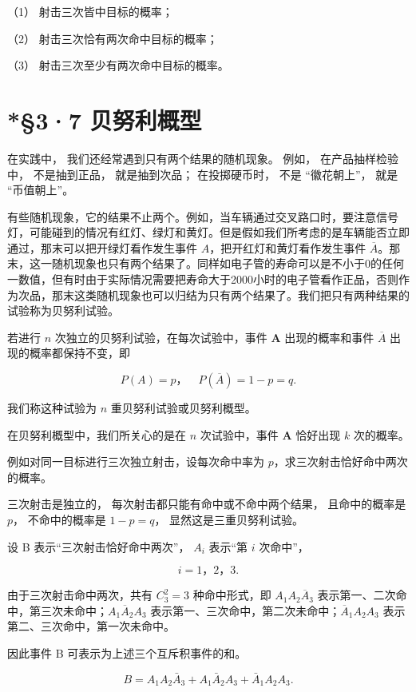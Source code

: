（1） 射击三次皆中目标的概率；

（2） 射击三次恰有两次命中目标的概率；

（3） 射击三次至少有两次命中目标的概率。

\section{*§3·7 贝努利概型}

在实践中， 我们还经常遇到只有两个结果的随机现象。 例如，
在产品抽样检验中， 不是抽到正品， 就是抽到次品； 在投掷硬币时， 不是
``徽花朝上''， 就是 ``币值朝上''。

有些随机现象，它的结果不止两个。例如，当车辆通过交叉路口时，要注意信号灯，可能碰到的情况有红灯、绿灯和黄灯。但是假如我们所考虑的是车辆能否立即通过，那末可以把开绿灯看作发生事件
\(A\)，把开红灯和黄灯看作发生事件
\(\overline{A}\)。那末，这一随机现象也只有两个结果了。同样如电子管的寿命可以是不小于0的任何一数值，但有时由于实际情况需要把寿命大于2000小时的电子管看作正品，否则作为次品，那末这类随机现象也可以归结为只有两个结果了。我们把只有两种结果的试验称为贝努利试验。

若进行 \(n\) 次独立的贝努利试验，在每次试验中，事件 \(\pmb{A}\)
出现的概率和事件 \(\overline{A}\) 出现的概率都保持不变，即

\[
P (A) = p\text{，} \quad P (\overline {{{A}}}) = 1 - p = q.
\]

我们称这种试验为 \(n\) 重贝努利试验或贝努利概型。

在贝努利概型中，我们所关心的是在 \(n\) 次试验中，事件 \(\pmb{A}\)
恰好出现 \(k\) 次的概率。

例如对同一目标进行三次独立射击，设每次命中率为
\(p\)，求三次射击恰好命中两次的概率。

 三次射击是独立的，
每次射击都只能有命中或不命中两个结果， 且命中的概率是 \(p\)，
不命中的概率是 \(1 - p = q\)， 显然这是三重贝努利试验。

设 B 表示``三次射击恰好命中两次''， \(A_i\) 表示``第 \(i\) 次命中''，

\[
i = 1\text{，} 2\text{，} 3.
\]

由于三次射击命中两次，共有 \(C_3^2 = 3\) 种命中形式，即
\(A_{1}A_{2}\overline{A}_{3}\)
表示第一、二次命中，第三次未命中；\(A_{1}\overline{A}_{2}A_{3}\)
表示第一、三次命中，第二次未命中；\(\overline{A}_{1}A_{2}A_{3}\)
表示第二、三次命中，第一次未命中。

因此事件 B 可表示为上述三个互斥积事件的和。

\[
B = A _ {1} A _ {2} \bar {A} _ {3} + A _ {1} \bar {A} _ {2} A _ {3} + \bar {A} _ {1} A _ {2} A _ {3}.
\]

